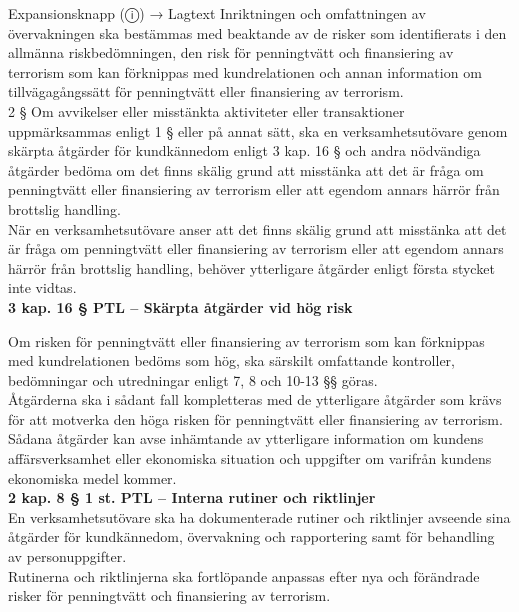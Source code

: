 \documentclass[10pt]{beamer}
\begin{document}
\begin{frame}[label=riskfragor-steg1]
\begin{alertblock}{Expansionsknapp (ⓘ) → Lagtext}
    \tiny Inriktningen och omfattningen av övervakningen ska bestämmas med beaktande av de risker 
    som identifierats i den allmänna riskbedömningen, den risk för penningtvätt och finansiering av 
    terrorism som kan förknippas med kundrelationen och annan information om tillvägagångssätt 
    för penningtvätt eller finansiering av terrorism.\\

    \tiny 2 §   Om avvikelser eller misstänkta aktiviteter eller transaktioner uppmärksammas enligt 
    1 § eller på annat sätt, ska en verksamhetsutövare genom skärpta åtgärder för kundkännedom enligt 
    3 kap. 16 § och andra nödvändiga åtgärder bedöma om det finns skälig grund att misstänka att det 
    är fråga om penningtvätt eller finansiering av terrorism eller att egendom annars härrör från 
    brottslig handling.\\

    \tiny När en verksamhetsutövare anser att det finns skälig grund att misstänka att det är fråga 
    om penningtvätt eller finansiering av terrorism eller att egendom annars härrör från brottslig 
    handling, behöver ytterligare åtgärder enligt första stycket inte vidtas.\\[0.1cm]
    

    \tiny \textbf{3 kap. 16 § PTL – Skärpta åtgärder vid hög risk}

    \tiny Om risken för penningtvätt eller finansiering av terrorism som kan förknippas med 
    kundrelationen bedöms som hög, ska särskilt omfattande kontroller, bedömningar och utredningar 
    enligt 7, 8 och 10-13 §§ göras.\\

    \tiny Åtgärderna ska i sådant fall kompletteras med de ytterligare åtgärder som krävs för att 
    motverka den höga risken för penningtvätt eller finansiering av terrorism. 
    Sådana åtgärder kan avse inhämtande av ytterligare information om kundens affärsverksamhet 
    eller ekonomiska situation och uppgifter om varifrån kundens ekonomiska medel kommer.\\[0.1cm]

    \tiny \textbf{2 kap. 8 § 1 st. PTL – Interna rutiner och riktlinjer}\\
    \tiny En verksamhetsutövare ska ha dokumenterade rutiner och riktlinjer avseende sina åtgärder 
    för kundkännedom, övervakning och rapportering samt för behandling av personuppgifter.\\

    \tiny Rutinerna och riktlinjerna ska fortlöpande anpassas efter nya och förändrade risker för 
    penningtvätt och finansiering av terrorism.\\


\end{alertblock}
\end{frame}
\end{document}
